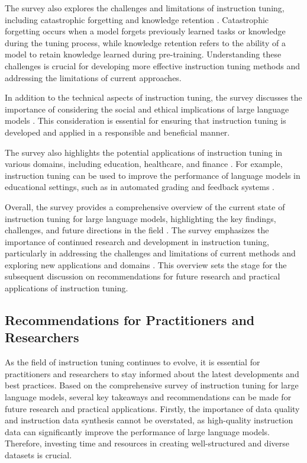 \documentclass[11pt]{article}
\begin{document}
The survey also explores the challenges and limitations of instruction tuning, including catastrophic forgetting and knowledge retention \cite{ref154}. Catastrophic forgetting occurs when a model forgets previously learned tasks or knowledge during the tuning process, while knowledge retention refers to the ability of a model to retain knowledge learned during pre-training. Understanding these challenges is crucial for developing more effective instruction tuning methods and addressing the limitations of current approaches.

In addition to the technical aspects of instruction tuning, the survey discusses the importance of considering the social and ethical implications of large language models \cite{ref155}. This consideration is essential for ensuring that instruction tuning is developed and applied in a responsible and beneficial manner.

The survey also highlights the potential applications of instruction tuning in various domains, including education, healthcare, and finance \cite{ref156}. For example, instruction tuning can be used to improve the performance of language models in educational settings, such as in automated grading and feedback systems \cite{ref157}.

Overall, the survey provides a comprehensive overview of the current state of instruction tuning for large language models, highlighting the key findings, challenges, and future directions in the field \cite{ref158}. The survey emphasizes the importance of continued research and development in instruction tuning, particularly in addressing the challenges and limitations of current methods and exploring new applications and domains \cite{ref159}. This overview sets the stage for the subsequent discussion on recommendations for future research and practical applications of instruction tuning.

\subsection{Recommendations for Practitioners and Researchers}

As the field of instruction tuning continues to evolve, it is essential for practitioners and researchers to stay informed about the latest developments and best practices. Based on the comprehensive survey of instruction tuning for large language models, several key takeaways and recommendations can be made for future research and practical applications. Firstly, the importance of data quality and instruction data synthesis \cite{ref32} cannot be overstated, as high-quality instruction data can significantly improve the performance of large language models. Therefore, investing time and resources in creating well-structured and diverse datasets is crucial.
\end{document}
